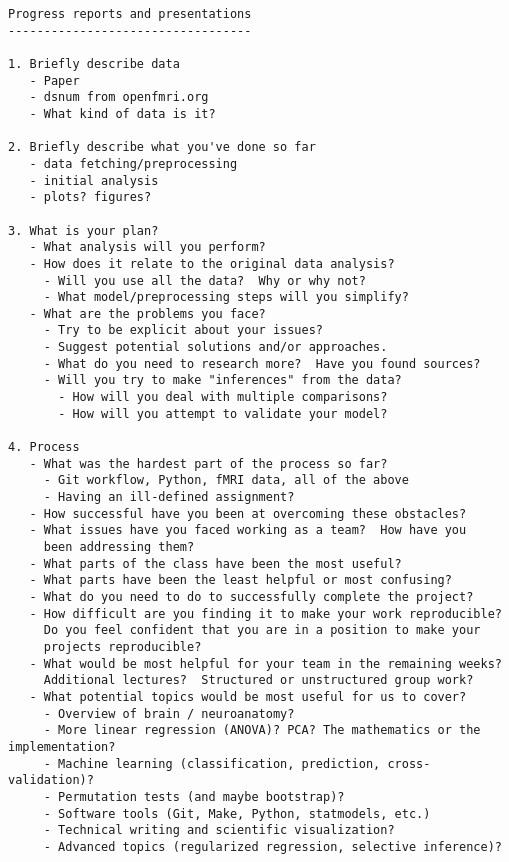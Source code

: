 \begin{verbatim}
Progress reports and presentations
----------------------------------

1. Briefly describe data
   - Paper
   - dsnum from openfmri.org
   - What kind of data is it?

2. Briefly describe what you've done so far
   - data fetching/preprocessing
   - initial analysis
   - plots? figures?

3. What is your plan?
   - What analysis will you perform?
   - How does it relate to the original data analysis?
     - Will you use all the data?  Why or why not?
     - What model/preprocessing steps will you simplify?
   - What are the problems you face?
     - Try to be explicit about your issues?
     - Suggest potential solutions and/or approaches.
     - What do you need to research more?  Have you found sources?
     - Will you try to make "inferences" from the data?
       - How will you deal with multiple comparisons?
       - How will you attempt to validate your model?     

4. Process
   - What was the hardest part of the process so far?
     - Git workflow, Python, fMRI data, all of the above
     - Having an ill-defined assignment?
   - How successful have you been at overcoming these obstacles?
   - What issues have you faced working as a team?  How have you
     been addressing them?
   - What parts of the class have been the most useful?
   - What parts have been the least helpful or most confusing?
   - What do you need to do to successfully complete the project?
   - How difficult are you finding it to make your work reproducible?
     Do you feel confident that you are in a position to make your
     projects reproducible?
   - What would be most helpful for your team in the remaining weeks?
     Additional lectures?  Structured or unstructured group work?
   - What potential topics would be most useful for us to cover?
     - Overview of brain / neuroanatomy?
     - More linear regression (ANOVA)? PCA? The mathematics or the implementation?
     - Machine learning (classification, prediction, cross-validation)?
     - Permutation tests (and maybe bootstrap)?
     - Software tools (Git, Make, Python, statmodels, etc.)
     - Technical writing and scientific visualization?
     - Advanced topics (regularized regression, selective inference)?
\end{verbatim}
